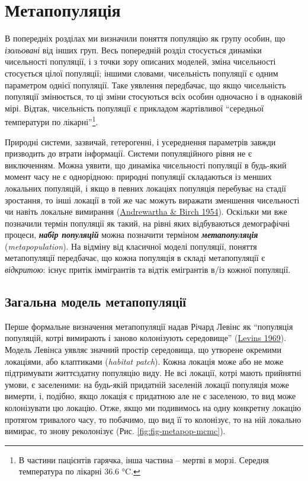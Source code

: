 \documentclass[
  11pt,
]{book}
\begin{document}
\section{Метапопуляція}\label{metapopulation}

В попередніх розділах ми визначили поняття популяцію як групу особин, що \emph{ізольовані} від інших груп. Весь попередній розділ стосується динаміки чисельності популяції, і з точки зору описаних моделей, зміна чисельності стосується цілої популяції; іншими словами, чисельність популяції є одним параметром однієї популяції. Таке уявлення передбачає, що якщо чисельність популяції змінюється, то ці зміни стосуються всіх особин одночасно і в однаковій мірі. Відтак, чисельність популяції є прикладом жартівливої ``середньої температури по лікарні''\footnote{В частини пацієнтів гарячка, інша частина -- мертві в морзі. Середня температура по лікарні 36.6 °C.}.

Природні системи, зазвичай, гетерогенні, і усереднення параметрів завжди призводить до втрати інформації. Системи популяційного рівня не є виключенням. Можна уявити, що динаміка чисельності популяції в будь-який момент часу не є однорідною: природні популяції складаються із менших локальних популяцій, і якщо в певних локаціях популяція перебуває на стадії зростання, то інші локації в той же час можуть виражати зменшення чисельності чи навіть локальне вимирання (\href{https://books.google.com/books/about/The_Distribution_and_Abundance_of_Animal.html?id=3uzaAAAAMAAJ}{Andrewartha \& Birch 1954}). Оскільки ми вже позначили термін популяції як такий, на рівні яких відбуваються демографічні процеси, \textbf{\emph{набір популяцій}} можна позначити терміном \textbf{\emph{метапопуляція}} (\emph{metapopulation}). На відміну від класичної моделі популяції, поняття метапопуляції передбачає, що кожна популяція в складі метапопуляції є \emph{відкритою}: існує притік іммігрантів та відтік емігрантів в/із кожної популяції.

\subsection{Загальна модель метапопуляції}\label{ux437ux430ux433ux430ux43bux44cux43dux430-ux43cux43eux434ux435ux43bux44c-ux43cux435ux442ux430ux43fux43eux43fux443ux43bux44fux446ux456ux457}

Перше формальне визначення метапопуляції надав Річард Левінс як ``популяція популяцій, котрі вимирають і заново колонізують середовище'' (\href{https://doi.org/10.1093/besa/15.3.237}{Levins 1969}). Модель Левінса уявляє значний простір середовища, що утворене окремими локаціями, або клаптиками (\emph{habitat patch}). Кожна локація може або не може підтримувати життєздатну популяцію виду. Не всі локації, котрі мають прийнятні умови, є заселеними: на будь-якій придатній заселеній локації популяція може вимерти, і, подібно, якщо локація є придатною але не є заселеною, то вид може колонізувати цю локацію. Отже, якщо ми подивимось на одну конкретну локацію протягом тривалого часу, то побачимо, що вид її то колонізує, то на ній локально вимирає, то знову реколонізує (Рис. \ref{fig:fig-metapop-mcmc}).
\end{document}
